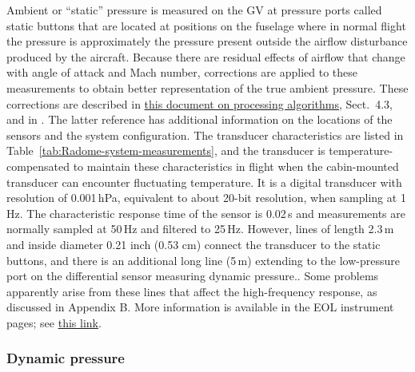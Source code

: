 \documentclass[12pt,twoside,english]{article}\usepackage[]{graphicx}\usepackage[]{color}
\let\OrgIndex\index
\renewcommand*{\index}[1]{\OrgIndex{#1}}
\begin{document}
Ambient or ``static'' pressure  is measured on the GV at pressure ports called static buttons that are located at positions on the fuselage where in normal flight the pressure is approximately the pressure present outside the airflow disturbance produced by the aircraft. Because there are residual effects of airflow that change with angle of attack and Mach number, corrections are applied to these measurements to obtain better representation of the true ambient pressure. These corrections are described in \href{https://drive.google.com/file/d/0B1kIUH45ca5ATFV5d3QyQ0JpSjA/view?usp=sharing}{this document on processing algorithms}, Sect.~4.3, and in \citet{CooperEtAl2014}. The latter reference has additional information on the locations of the sensors and the system configuration. The transducer characteristics are listed in Table~\ref{tab:Radome-system-measurements}, and the transducer is temperature-compensated to maintain these characteristics in flight when the cabin-mounted transducer can encounter fluctuating temperature. It is a digital transducer with resolution of 0.001\,hPa, equivalent to about 20-bit resolution, when sampling at 1\,Hz. The characteristic response time of the sensor is 0.02\,s and measurements are normally sampled at 50\,Hz and filtered to 25\,Hz. However, lines of length 2.3\,m and inside diameter 0.21 inch (0.53 cm) connect the transducer to the static buttons, and there is an additional long line (5\,m) extending to the low-pressure port on the differential sensor measuring dynamic pressure.. Some problems apparently arise from these lines that affect the high-frequency response, as discussed in Appendix B\@. More information is available in the EOL instrument pages; see \href{https://www.eol.ucar.edu/instruments/ambient-static-pressure}{this link}. 


\subsubsection{Dynamic pressure\label{sub:Dynamic-pressure}}
\end{document}
